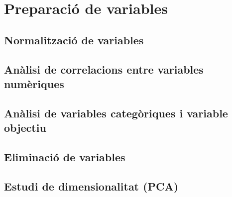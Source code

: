 \section{Preparació de variables}

\subsection{Normalització de variables}

\subsection{Anàlisi de correlacions entre variables numèriques}

\subsection{Anàlisi de variables categòriques i variable objectiu}

\subsection{Eliminació de variables}

\subsection{Estudi de dimensionalitat (PCA)}